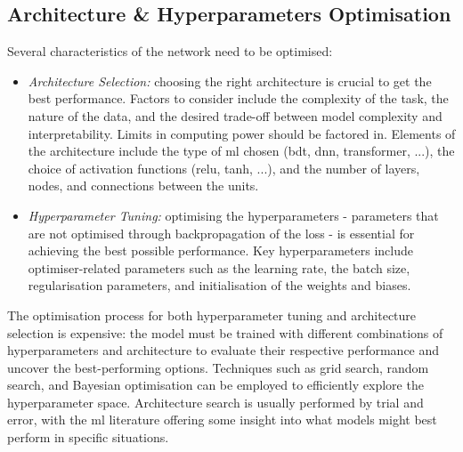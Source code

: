 \subsection{Architecture \& Hyperparameters Optimisation}
Several characteristics of the network need to be optimised: 
\begin{itemize}[leftmargin=*]
    \item \textit{Architecture Selection:} choosing the right architecture is crucial to get the best performance. Factors to consider include the complexity of the task, the nature of the data, and the desired trade-off between model complexity and interpretability. Limits in computing power should be factored in. Elements of the architecture include the type of \gls{ml} chosen (\gls{bdt}, \gls{dnn}, transformer, ...), the choice of activation functions (\gls{relu}, tanh, ...), and the number of layers, nodes, and connections between the units.
    \item \textit{Hyperparameter Tuning:} optimising the hyperparameters - parameters that are not optimised through backpropagation of the loss - is essential for achieving the best possible performance. Key hyperparameters include optimiser-related parameters such as the learning rate, the batch size, regularisation parameters, and initialisation of the weights and biases.
\end{itemize}
The optimisation process for both hyperparameter tuning and architecture selection is expensive: the model must be trained with different combinations of hyperparameters and architecture to evaluate their respective performance and uncover the best-performing options. Techniques such as grid search, random search, and Bayesian optimisation can be employed to efficiently explore the hyperparameter space. Architecture search is usually performed by trial and error, with the \gls{ml} literature offering some insight into what models might best perform in specific situations. 

